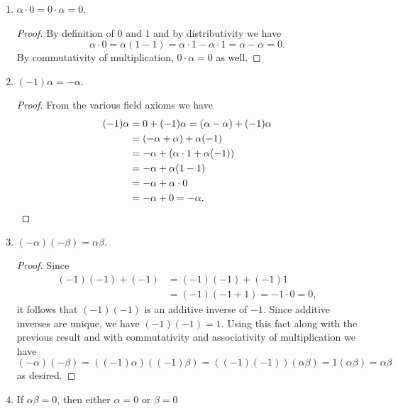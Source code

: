 \begin{enumerate}
\begin{proof}
\begin{equation*}
      = \alpha + (-\alpha + \beta)
      = (\alpha - \alpha) + \beta
      = 0 + \beta
      = \beta. \qedhere
    \end{equation*}
  \end{proof}
\item $\alpha\cdot0 = 0\cdot\alpha = 0$.
  \begin{proof}
    By definition of $0$ and $1$ and by distributivity we have
    \begin{equation*}
      \alpha\cdot0 = \alpha(1 - 1)
      = \alpha\cdot1 - \alpha\cdot1
      = \alpha - \alpha = 0.
    \end{equation*}
    By commutativity of multiplication, $0\cdot\alpha = 0$ as well.
  \end{proof}
\item $(-1)\alpha = -\alpha$.
  \begin{proof}
    From the various field axioms we have
    \begin{align*}
      (-1)\alpha
      &= 0 + (-1)\alpha
        = (\alpha - \alpha) + (-1)\alpha \\
      &= (-\alpha + \alpha) + \alpha(-1) \\
      &= -\alpha + (\alpha\cdot1 + \alpha(-1)) \\
      &= -\alpha + \alpha(1 - 1) \\
      &= -\alpha + \alpha\cdot0 \\
      &= -\alpha + 0
        = -\alpha. \qedhere
    \end{align*}
  \end{proof}
\item $(-\alpha)(-\beta) = \alpha\beta$.
  \begin{proof}
    Since
    \begin{align*}
      (-1)(-1) + (-1) &= (-1)(-1) + (-1)1 \\
                      &= (-1)(-1 + 1) = -1\cdot0 = 0,
    \end{align*}
    it follows that $(-1)(-1)$ is an additive inverse of $-1$. Since
    additive inverses are unique, we have $(-1)(-1) = 1$. Using this
    fact along with the previous result and with commutativity and
    associativity of multiplication we have
    \begin{equation*}
      (-\alpha)(-\beta)
      = ((-1)\alpha)((-1)\beta)
      = ((-1)(-1))(\alpha\beta)
      = 1(\alpha\beta) = \alpha\beta
    \end{equation*}
    as desired.
  \end{proof}
\item If $\alpha\beta = 0$, then either $\alpha = 0$ or $\beta = 0$

\end{enumerate}
